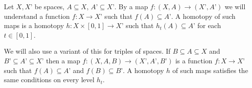 \begin{note}
Let $X, X’$  be spaces, $A\subseteq X$, $A’\subseteq X’$. By a map $f\colon (X, A) \to (X’, A’)$
we will understand a function $f\colon X \to X’$ such that $f(A)\subseteq A’$. A homotopy 
of such maps is a homotopy $h\colon X\times [0, 1] \to X’$ such that $h_{t}(A)\subseteq A’$
for each $t\in [0, 1]$. 

We will also use a variant of this for triples of spaces. If $B\subseteq A \subseteq X$
and $B’\subseteq A’ \subseteq X’$ then a map $f\colon (X, A, B) \to (X’, A’, B’)$ is a 
function $f\colon X\to X’$ such that $f(A)\subseteq A’$ and $f(B)\subseteq B’$. A homotopy 
$h$ of such maps satisfies the same conditions on every level $h_{t}$. 
\end{note}



